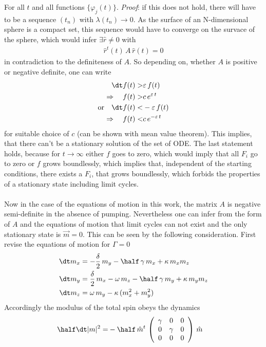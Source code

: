     For all $t$ and all functions $\{\varphi_j(t)\}$. \textit{Proof}: if this does not hold, there will have to be a sequence $(t_n)$ with $\lambda(t_n)\rightarrow0$. As the surface of an N-dimensional sphere is a compact set, this sequence would have to converge on the survace of the sphere, which would infer $\exists \hat{r}\neq0$ with 
    \begin{align*}
        \hat{r}^t(t)\,A\,\hat{r}(t)=0
    \end{align*}
    in contradiction to the definiteness of $A$. So depending on, whether $A$ is positive or negative definite, one can write
    \begin{align*}
        \dt f(t) >& \varepsilon\,f(t)\\
        \Rightarrow\quad f(t) >& c\,e^{\varepsilon\,t}\\
        \text{or}\quad \dt f(t) <& -\varepsilon\,f(t)\\
        \Rightarrow\quad f(t) <& c\,e^{-\varepsilon\,t}\\
    \end{align*}
    for suitable choice of $c$ (can be shown with mean value theorem). This implies, that there can't be a stationary solution of the set of ODE. The last statement holds, because for $t\rightarrow\infty$ either $f$ goes to zero, which would imply that all $F_i$ go to zero or $f$ grows boundlessly, which implies that, independent of the starting conditions, there exists a $F_i$, that grows boundlessly, which forbids the properties of a stationary state including limit cycles.\\\\Now in the case of the equations of motion in this work, the matrix $A$ is negative semi-definite in the absence of pumping. Nevertheless one can infer from the form of $A$ and the equations of motion that limit cycles can not exist and the only stationary state is $\vec{m}=0$. This can be seen by the following consideration. First revise the equations of motion for $\Gamma=0$
    \begin{align*}
        \dt m_x &= -\frac{\delta}{2}\,m_y-\half\,\gamma\,m_x+\kappa\,m_x m_z\\
        \dt m_y &= \frac{\delta}{2}\,m_x-\omega\,m_z-\half\,\gamma\,m_y+\kappa\,m_y m_z\\
        \dt m_z &= \omega\,m_y - \kappa\,(m_x^2+m_y^2)
    \end{align*}
    Accordingly the modulus of the total spin obeys the dynamics
    \begin{align*}
        \half\dt |m|^2=&-\half\,\hat{m}^t\,\left( \begin{array}{ccc}
            \gamma & 0&0  \\
            0& \gamma & 0\\
            0&0&0
       \end{array}\right)\,\hat{m}
    \end{align*}
